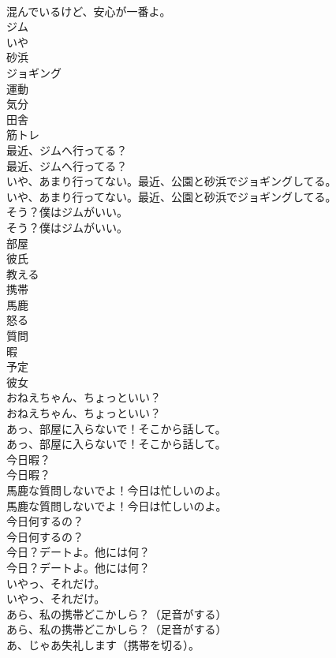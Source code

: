 \documentclass[8pt]{extreport}
\begin{document}
\begin{CJK}{UTF8}{min}
\\	混んでいるけど、安心が一番よ。 
\\	ジム
\\	いや
\\	砂浜
\\	ジョギング
\\	運動
\\	気分
\\	田舎
\\	筋トレ
\\	最近、ジムへ行ってる？	
\\	最近、ジムへ行ってる？ 
\\	いや、あまり行ってない。最近、公園と砂浜でジョギングしてる。	
\\	いや、あまり行ってない。最近、公園と砂浜でジョギングしてる。 
\\	そう？僕はジムがいい。	
\\	そう？僕はジムがいい。 
\\	部屋
\\	彼氏
\\	教える
\\	携帯
\\	馬鹿
\\	怒る
\\	質問
\\	暇
\\	予定
\\	彼女
\\	おねえちゃん、ちょっといい？	
\\	おねえちゃん、ちょっといい？ 
\\	あっ、部屋に入らないで！そこから話して。	
\\	あっ、部屋に入らないで！そこから話して。 
\\	今日暇？	
\\	今日暇？ 
\\	馬鹿な質問しないでよ！今日は忙しいのよ。	
\\	馬鹿な質問しないでよ！今日は忙しいのよ。 
\\	今日何するの？	
\\	今日何するの？ 
\\	今日？デートよ。他には何？	
\\	今日？デートよ。他には何？ 
\\	いやっ、それだけ。	
\\	いやっ、それだけ。 
\\	あら、私の携帯どこかしら？（足音がする）	
\\	あら、私の携帯どこかしら？（足音がする） 
\\	あ、じゃあ失礼します（携帯を切る）。	

\end{CJK}
\end{document}
